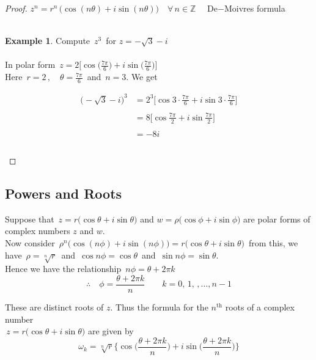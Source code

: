 \documentclass[11pt,a4paper]{article}
\theoremstyle{definition}
\newtheorem{example}[thm]{Example}
\begin{document}
\begin{proof}
$\boxed{ z^n = r^n\, \big( \cos (n\theta) + i\sin (n\theta)\big)\quad  \forall\,n \in \mathbb{Z}}\quad $  De$-$Moivres formula\\\\



\begin{example}
Compute $\,z^3\,$ for  $ z = -\sqrt{3} - i$\\

\text{\textcolor{red}{Solution}}\\
In polar form $\, z = 2\Big[ \cos \Big(\frac{7\pi}{6}\Big) + i \sin \Big(\frac{7\pi}{6}\Big)\Big]$\\

Here $\, r = 2\, , \quad  \theta = \frac{7\pi}{6}\,$ and $\, n = 3$. We get

\begin{align*}
\big(-\sqrt{3} - i\big)^3 & = 2^3 \Big[\cos 3\cdot\frac{7\pi}{6} + i \sin 3\cdot \frac{7\pi}{6}\Big]\\\\
& = 8 \Big[ \cos \frac{7\pi}{2} + i \sin \frac{7\pi}{2}\Big]\\\\
& = -8i\\\\
\end{align*}
\end{example}
\end{proof}

{\color[wave]{485}\subsection{Powers and Roots}}
Suppose that $\, z = r \big(\cos \theta + i\sin \theta\big)$ and $w = \rho \big( \cos \phi + i \sin \phi\big)$ are polar forms of complex numbers $z$ and $w$.\\

Now consider $\, \rho^n \big(\cos (n\phi) + i\sin(n\phi)\big) = r\big(\cos \theta + i \sin \theta\big)\,$ from this, we have $\, \rho = \sqrt[n]{r}\,$ and $\, \cos n\phi = \cos \theta\,$ and $\, \sin n \phi = \sin \theta$.\\

Hence we have the relationship $\, n \phi = \theta + 2\pi k$ $$\therefore\quad  \phi = \frac{\theta + 2\pi k}{n}\qquad  k = 0,\, 1,\,,\ldots , n-1$$

These are distinct roots of $z$. Thus the formula for the $n^{\text{th}}$ roots of a complex number\\ $\, z = r\big( \cos\theta + i \sin \theta\big)$ are given by $$\omega_k = \sqrt[n]{r} \Bigg\{ \cos \Big(\frac{\theta + 2\pi k}{n}\Big) + i \sin \Big(\frac{\theta + 2\pi k}{n}\Big)\Bigg\}$$\\
\end{document}
